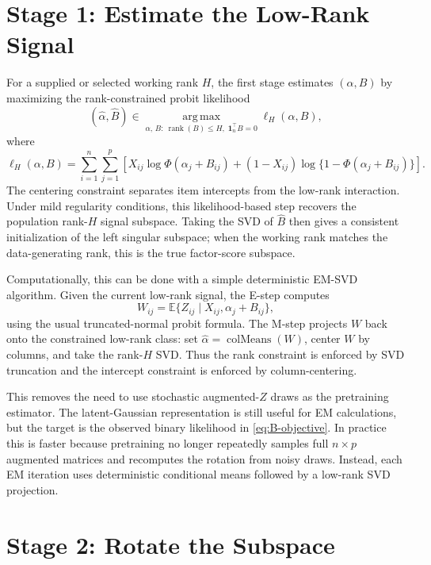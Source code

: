 \documentclass[11pt]{article}
\newcommand{\E}{\mathbb{E}}
\newcommand{\argmax}{\operatorname*{arg\,max}}
\newcommand{\rank}{\operatorname{rank}}
\newcommand{\PhiN}{\Phi}
\begin{document}
\section{Stage 1: Estimate the Low-Rank Signal}

For a supplied or selected working rank \(H\), the first stage estimates
\((\alpha,B)\) by maximizing the rank-constrained probit likelihood
\begin{equation}
  (\widehat\alpha,\widehat B)
  \in
  \argmax_{\alpha,\,B:\ \rank(B)\leq H,\; \bm 1_n^\top B=0}
  \ell_H(\alpha,B),
  \label{eq:B-objective}
\end{equation}
where
\begin{equation}
  \ell_H(\alpha,B)=
  \sum_{i=1}^n\sum_{j=1}^p
  \left[
    X_{ij}\log\PhiN(\alpha_j+B_{ij})
    +(1-X_{ij})\log\{1-\PhiN(\alpha_j+B_{ij})\}
  \right].
\end{equation}
The centering constraint separates item intercepts from the low-rank
interaction.  Under mild regularity conditions, this likelihood-based step
recovers the population rank-\(H\) signal subspace.  Taking the SVD of
\(\widehat B\) then gives a consistent initialization of the left singular
subspace; when the working rank matches the data-generating rank, this is the
true factor-score subspace.

Computationally, this can be done with a simple deterministic EM-SVD
algorithm.  Given the current low-rank signal, the E-step computes
\[
  W_{ij}=\E\{Z_{ij}\mid X_{ij},\alpha_j+B_{ij}\},
\]
using the usual truncated-normal probit formula.  The M-step projects \(W\)
back onto the constrained low-rank class: set
\(\widehat\alpha=\operatorname{colMeans}(W)\), center \(W\) by columns, and
take the rank-\(H\) SVD.  Thus the rank constraint is enforced by SVD
truncation and the intercept constraint is enforced by column-centering.

This removes the need to use stochastic augmented-\(Z\) draws as the
pretraining estimator.  The latent-Gaussian representation is still useful for
EM calculations, but the target is the observed binary likelihood in
\eqref{eq:B-objective}.  In practice this is faster because pretraining no
longer repeatedly samples full \(n\times p\) augmented matrices and recomputes
the rotation from noisy draws.  Instead, each EM iteration uses deterministic
conditional means followed by a low-rank SVD projection.

\section{Stage 2: Rotate the Subspace}
\end{document}
